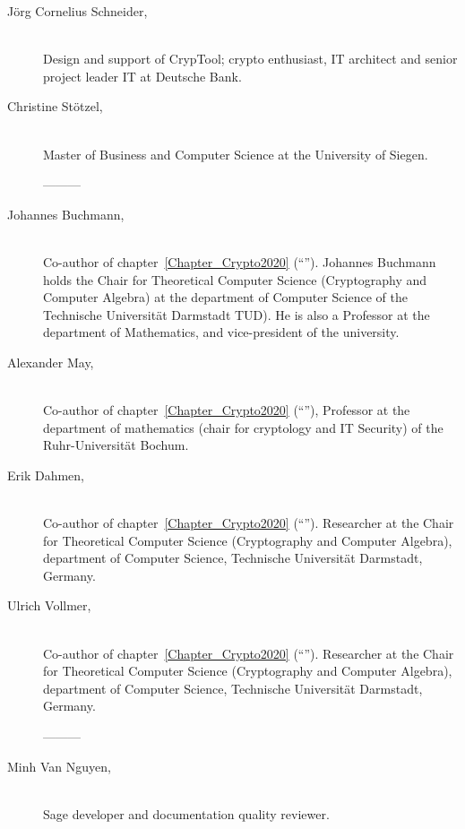 \begin{description}
\item[J\"org Cornelius Schneider,] \mbox{}\\
Design and support of CrypTool; crypto enthusiast, IT architect and
senior project leader IT at Deutsche Bank.

\item[Christine St\"otzel,] \mbox{}\\
Master of Business and Computer Science at the University of Siegen.

---------

\item[Johannes Buchmann,] \mbox{}\\
Co-author of chapter~\ref{Chapter_Crypto2020} (``'').
Johannes Buchmann holds the Chair for Theoretical Computer Science (Cryptography
and Computer Algebra) at the department of Computer Science of the Technische
Universit\"at Darmstadt TUD).  He is also a Professor at the department of Mathematics, and vice-president of the university.

\item[Alexander May,] \mbox{}\\
Co-author of chapter~\ref{Chapter_Crypto2020} (``''), 
Professor at the department of mathematics (chair for cryptology and IT Security) of the Ruhr-Universit\"at Bochum.


\item[Erik Dahmen,] \mbox{}\\
Co-author of chapter~\ref{Chapter_Crypto2020} (``''). 
Researcher at the Chair for Theoretical Computer Science (Cryptography and
Computer Algebra), department of Computer Science, Technische Universit\"at
Darmstadt, Germany.

\item[Ulrich Vollmer,] \mbox{}\\
Co-author of chapter~\ref{Chapter_Crypto2020} (``'').
Researcher at the Chair for Theoretical Computer Science (Cryptography and
Computer Algebra), department of Computer Science, Technische Universit\"at
Darmstadt, Germany.

---------

\item[Minh Van Nguyen,] \mbox{}\\
Sage developer and documentation quality reviewer.



\end{description}

